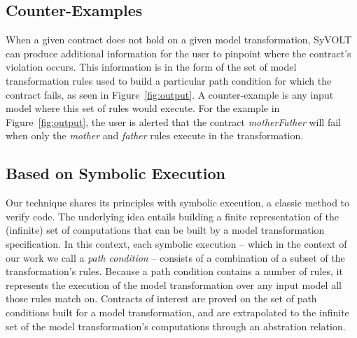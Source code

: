\subsection{Counter-Examples}

When a given contract does not hold on a given model transformation,
SyVOLT can produce additional information for the user to pinpoint where
the contract's violation occurs. This information is in
the form of the set of model transformation rules used to build a particular
path condition for which the contract fails, as seen in Figure~\ref{fig:output}. A counter-example is any input model where this set of rules would execute. For the example in Figure~\ref{fig:output}, the user is alerted that the contract \textit{motherFather} will fail when only the \textit{mother} and \textit{father} rules execute in the transformation.



\subsection{Based on Symbolic Execution}

Our technique shares its principles with symbolic execution, a classic method to
verify code. The underlying idea entails building a finite representation of the
(infinite) set of computations that can be built by a model transformation
specification. In this context, each symbolic execution -- which in the context
of our work we call a \emph{path condition} -- consists of a combination
of a subset of the transformation's rules.
Because a path condition contains a number of rules, it represents the execution
of the model transformation over any input model all those rules match on.
Contracts of interest are proved on the set of path conditions built for a
model transformation, and are extrapolated to the infinite set of
the model transformation's computations through an abstration relation.








